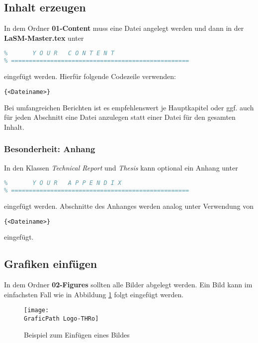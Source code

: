 \subsection{Inhalt erzeugen}
In dem Ordner \textbf{01-Content} muss eine Datei angelegt werden und dann in der \textbf{LaSM-Master.tex} unter 
\begin{lstlisting}[language=tex]
% ==================================================
%       Y O U R   C O N T E N T 
% ==================================================   
\end{lstlisting}
eingefügt werden.
Hierfür folgende Codezeile verwenden:
\begin{lstlisting}[language=tex]
{<Dateiname>}
\end{lstlisting}
Bei umfangreichen Berichten ist es empfehlenswert je Hauptkapitel oder ggf. auch für jeden Abschnitt eine Datei anzulegen statt einer Datei für den gesamten Inhalt.

\subsubsection{Besonderheit: Anhang}
In den Klassen \textit{Technical Report} und \textit{Thesis} kann optional ein Anhang unter
\begin{lstlisting}[language=tex]
% ==================================================
%       Y O U R   A P P E N D I X
% ==================================================   
\end{lstlisting}
eingefügt werden.
Abschnitte des Anhanges werden analog unter Verwendung von
\begin{lstlisting}[language=tex]
{<Dateiname>}
\end{lstlisting}
eingefügt.
%
\subsection{Grafiken einfügen}
In dem Ordner \textbf{02-Figures} sollten alle Bilder abgelegt werden.
Ein Bild kann im einfachsten Fall wie in Abbildung \ref{fig:my_exampleFigure} folgt eingefügt werden.
\begin{figure}
    \centering %
    \texttt{[image: \\GraficPath Logo-THRo]}
    \caption{Beispiel zum Einfügen eines Bildes} %
    \label{fig:my_exampleFigure}
\end{figure}

